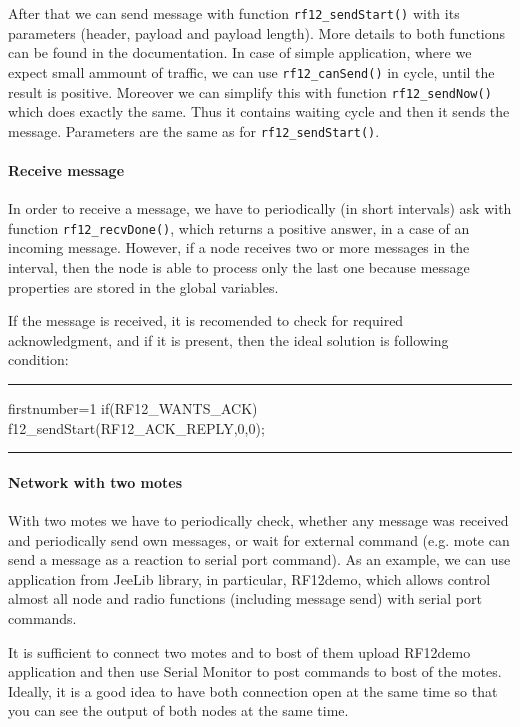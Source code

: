 \documentclass[12pt,titlepage]{article}
\newcommand{\codetitle}[1]{\bigskip \noindent {\scriptsize #1}\hrule}
\begin{document}
    After that we can send message with function \texttt{rf12\_sendStart()} with its parameters (header, payload and payload length). More details to both functions can be found in the documentation. In case of simple application, where we expect small ammount of traffic, we can use \texttt{rf12\_canSend()} in cycle, until the result is positive. Moreover we can simplify this with function \texttt{rf12\_sendNow()} which does exactly the same. Thus it contains waiting cycle and then it sends the message. Parameters are the same as for  \texttt{rf12\_sendStart()}.

        \paragraph{Receive message}
        In order to receive a message, we have to periodically (in short intervals) ask with function \texttt{rf12\_recvDone()}, which returns a positive answer, in a case of an incoming message. However, if a node receives two or more messages in the interval, then the node is able to process only the last one because message properties are stored in the global variables.

        If the message is received, it is recomended to check for required acknowledgment, and if it is present, then the ideal solution is following condition:

        \codetitle{Example condition for ACK checking}
        \begin{cppcode*}{firstnumber=1}
        if(RF12_WANTS_ACK){
            f12_sendStart(RF12_ACK_REPLY,0,0);
        }
        \end{cppcode*}
        \hrule
        \bigskip

        \paragraph{Network with two motes}
        With two motes we have to periodically check, whether any message was received and periodically send own messages, or wait for external command (e.g. mote can send a message as a reaction to serial port command). As an example, we can use application from JeeLib library, in particular, RF12demo, which allows control almost all node and radio functions (including message send) with serial port commands.

        It is sufficient to connect two motes and to bost of them upload RF12demo application and then use Serial Monitor to post commands to bost of the motes. Ideally, it is a good idea to have both connection open at the same time so that you can see the output of both nodes at the same time.
\end{document}
